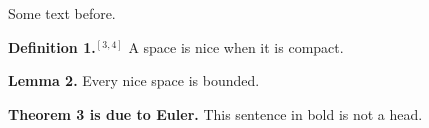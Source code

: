 \documentclass{article}
\begin{document}
Some text before.

\textbf{Definition 1.$^{[3,4]}$} A space is nice when it is compact.

\textbf{Lemma 2.\cite{ref}} Every nice space is bounded.

\textbf{Theorem 3 is due to Euler.} This sentence in bold is not a head.
\end{document}
